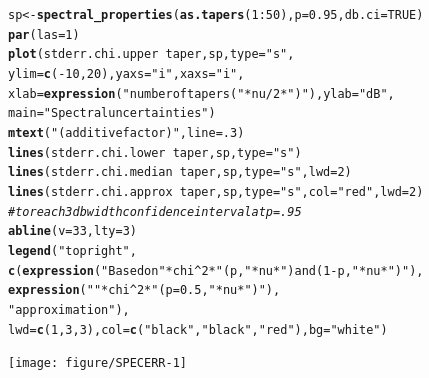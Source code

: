 \documentclass[10pt]{article}\usepackage[]{graphicx}\usepackage[]{color}
\makeatletter
\newcommand{\hlnum}[1]{\textcolor[rgb]{0.686,0.059,0.569}{#1}}%
\newcommand{\hlstr}[1]{\textcolor[rgb]{0.192,0.494,0.8}{#1}}%
\newcommand{\hlcom}[1]{\textcolor[rgb]{0.678,0.584,0.686}{\textit{#1}}}%
\newcommand{\hlopt}[1]{\textcolor[rgb]{0,0,0}{#1}}%
\newcommand{\hlstd}[1]{\textcolor[rgb]{0.345,0.345,0.345}{#1}}%
\newcommand{\hlkwb}[1]{\textcolor[rgb]{0.69,0.353,0.396}{#1}}%
\newcommand{\hlkwc}[1]{\textcolor[rgb]{0.333,0.667,0.333}{#1}}%
\newcommand{\hlkwd}[1]{\textcolor[rgb]{0.737,0.353,0.396}{\textbf{#1}}}%
\newenvironment{kframe}{%
 \def\at@end@of@kframe{}%
 \ifinner\ifhmode%
  \def\at@end@of@kframe{\end{minipage}}%
  \begin{minipage}{\columnwidth}%
 \fi\fi%
 \def\FrameCommand##1{\hskip\@totalleftmargin \hskip-\fboxsep
 \colorbox{shadecolor}{##1}\hskip-\fboxsep
     \hskip-\linewidth \hskip-\@totalleftmargin \hskip\columnwidth}%
 \MakeFramed {\advance\hsize-\width
   \@totalleftmargin\z@ \linewidth\hsize
   \@setminipage}}%
 {\par\unskip\endMakeFramed%
 \at@end@of@kframe}
\newenvironment{knitrout}{}{} %
\makeatother
\begin{document}
\begin{figure}[h!]
\begin{center}
\begin{knitrout}
\color{fgcolor}\begin{kframe}
\begin{alltt}
\hlstd{sp} \hlkwb{<-} \hlkwd{spectral_properties}\hlstd{(}\hlkwd{as.tapers}\hlstd{(}\hlnum{1}\hlopt{:}\hlnum{50}\hlstd{),} \hlkwc{p}\hlstd{=}\hlnum{0.95}\hlstd{,} \hlkwc{db.ci}\hlstd{=}\hlnum{TRUE}\hlstd{)}
\hlkwd{par}\hlstd{(}\hlkwc{las}\hlstd{=}\hlnum{1}\hlstd{)}
\hlkwd{plot}\hlstd{(stderr.chi.upper} \hlopt{~} \hlstd{taper, sp,} \hlkwc{type}\hlstd{=}\hlstr{"s"}\hlstd{,}
       \hlkwc{ylim}\hlstd{=}\hlkwd{c}\hlstd{(}\hlopt{-}\hlnum{10}\hlstd{,}\hlnum{20}\hlstd{),} \hlkwc{yaxs}\hlstd{=}\hlstr{"i"}\hlstd{,} \hlkwc{xaxs}\hlstd{=}\hlstr{"i"}\hlstd{,}
       \hlkwc{xlab}\hlstd{=}\hlkwd{expression}\hlstd{(}\hlstr{"number of tapers ("}\hlopt{*} \hlstd{nu}\hlopt{/}\hlnum{2} \hlopt{*}\hlstr{")"}\hlstd{),} \hlkwc{ylab}\hlstd{=}\hlstr{"dB"}\hlstd{,}
       \hlkwc{main}\hlstd{=}\hlstr{"Spectral uncertainties"}\hlstd{)}
\hlkwd{mtext}\hlstd{(}\hlstr{"(additive factor)"}\hlstd{,} \hlkwc{line}\hlstd{=}\hlnum{.3}\hlstd{)}
\hlkwd{lines}\hlstd{(stderr.chi.lower} \hlopt{~} \hlstd{taper, sp,} \hlkwc{type}\hlstd{=}\hlstr{"s"}\hlstd{)}
\hlkwd{lines}\hlstd{(stderr.chi.median} \hlopt{~} \hlstd{taper, sp,} \hlkwc{type}\hlstd{=}\hlstr{"s"}\hlstd{,} \hlkwc{lwd}\hlstd{=}\hlnum{2}\hlstd{)}
\hlkwd{lines}\hlstd{(stderr.chi.approx} \hlopt{~} \hlstd{taper, sp,} \hlkwc{type}\hlstd{=}\hlstr{"s"}\hlstd{,} \hlkwc{col}\hlstd{=}\hlstr{"red"}\hlstd{,}\hlkwc{lwd}\hlstd{=}\hlnum{2}\hlstd{)}
\hlcom{# to reach 3 db width confidence interval at p=.95}
\hlkwd{abline}\hlstd{(}\hlkwc{v}\hlstd{=}\hlnum{33}\hlstd{,} \hlkwc{lty}\hlstd{=}\hlnum{3}\hlstd{)}
\hlkwd{legend}\hlstd{(}\hlstr{"topright"}\hlstd{,}
        \hlkwd{c}\hlstd{(}\hlkwd{expression}\hlstd{(}\hlstr{"Based on "}\hlopt{*} \hlstd{chi}\hlopt{^}\hlnum{2} \hlopt{*}\hlstr{"(p,"}\hlopt{*}\hlstd{nu}\hlopt{*}\hlstr{") and (1-p,"}\hlopt{*}\hlstd{nu}\hlopt{*}\hlstr{")"}\hlstd{),}
          \hlkwd{expression}\hlstd{(}\hlstr{""}\hlopt{*} \hlstd{chi}\hlopt{^}\hlnum{2} \hlopt{*}\hlstr{"(p=0.5,"}\hlopt{*}\hlstd{nu}\hlopt{*}\hlstr{")"}\hlstd{),}
          \hlstr{"approximation"}\hlstd{),}
\hlkwc{lwd}\hlstd{=}\hlkwd{c}\hlstd{(}\hlnum{1}\hlstd{,}\hlnum{3}\hlstd{,}\hlnum{3}\hlstd{),} \hlkwc{col}\hlstd{=}\hlkwd{c}\hlstd{(}\hlstr{"black"}\hlstd{,}\hlstr{"black"}\hlstd{,}\hlstr{"red"}\hlstd{),} \hlkwc{bg}\hlstd{=}\hlstr{"white"}\hlstd{)}
\end{alltt}
\end{kframe}
\texttt{[image: figure/SPECERR-1]} 


\end{knitrout}
\end{center}
\end{figure}
\end{document}
